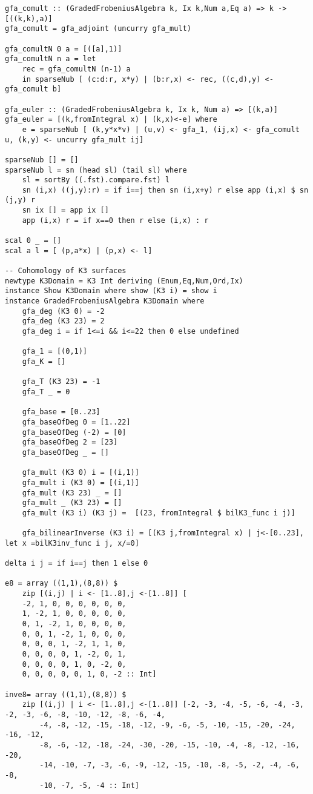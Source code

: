\begin{lstlisting}
gfa_comult :: (GradedFrobeniusAlgebra k, Ix k,Num a,Eq a) => k -> [((k,k),a)]
gfa_comult = gfa_adjoint (uncurry gfa_mult)

gfa_comultN 0 a = [([a],1)]
gfa_comultN n a = let
	rec = gfa_comultN (n-1) a
	in sparseNub [ (c:d:r, x*y) | (b:r,x) <- rec, ((c,d),y) <- gfa_comult b]

gfa_euler :: (GradedFrobeniusAlgebra k, Ix k, Num a) => [(k,a)]
gfa_euler = [(k,fromIntegral x) | (k,x)<-e] where 
	e = sparseNub [ (k,y*x*v) | (u,v) <- gfa_1, (ij,x) <- gfa_comult u, (k,y) <- uncurry gfa_mult ij] 

sparseNub [] = []
sparseNub l = sn (head sl) (tail sl) where
	sl = sortBy ((.fst).compare.fst) l
	sn (i,x) ((j,y):r) = if i==j then sn (i,x+y) r else app (i,x) $ sn (j,y) r
	sn ix [] = app ix []
	app (i,x) r = if x==0 then r else (i,x) : r

scal 0 _ = []
scal a l = [ (p,a*x) | (p,x) <- l]

-- Cohomology of K3 surfaces
newtype K3Domain = K3 Int deriving (Enum,Eq,Num,Ord,Ix)
instance Show K3Domain where show (K3 i) = show i
instance GradedFrobeniusAlgebra K3Domain where
	gfa_deg (K3 0) = -2
	gfa_deg (K3 23) = 2
	gfa_deg i = if 1<=i && i<=22 then 0 else undefined
	
	gfa_1 = [(0,1)]
	gfa_K = []
	
	gfa_T (K3 23) = -1
	gfa_T _ = 0
	
	gfa_base = [0..23]
	gfa_baseOfDeg 0 = [1..22]
	gfa_baseOfDeg (-2) = [0]
	gfa_baseOfDeg 2 = [23]
	gfa_baseOfDeg _ = []
	
	gfa_mult (K3 0) i = [(i,1)]
	gfa_mult i (K3 0) = [(i,1)]
	gfa_mult (K3 23) _ = []
	gfa_mult _ (K3 23) = []
	gfa_mult (K3 i) (K3 j) =  [(23, fromIntegral $ bilK3_func i j)]
	
	gfa_bilinearInverse (K3 i) = [(K3 j,fromIntegral x) | j<-[0..23], let x =bilK3inv_func i j, x/=0]

delta i j = if i==j then 1 else 0

e8 = array ((1,1),(8,8)) $
	zip [(i,j) | i <- [1..8],j <-[1..8]] [
	-2, 1, 0, 0, 0, 0, 0, 0,
	1, -2, 1, 0, 0, 0, 0, 0,
	0, 1, -2, 1, 0, 0, 0, 0,
	0, 0, 1, -2, 1, 0, 0, 0,
	0, 0, 0, 1, -2, 1, 1, 0,
	0, 0, 0, 0, 1, -2, 0, 1,
	0, 0, 0, 0, 1, 0, -2, 0,
	0, 0, 0, 0, 0, 1, 0, -2 :: Int]

inve8= array ((1,1),(8,8)) $
	zip [(i,j) | i <- [1..8],j <-[1..8]] [-2, -3, -4, -5, -6, -4, -3, -2, -3, -6, -8, -10, -12, -8, -6, -4,
		-4, -8, -12, -15, -18, -12, -9, -6, -5, -10, -15, -20, -24, -16, -12,
		-8, -6, -12, -18, -24, -30, -20, -15, -10, -4, -8, -12, -16, -20,
		-14, -10, -7, -3, -6, -9, -12, -15, -10, -8, -5, -2, -4, -6, -8,
		-10, -7, -5, -4 :: Int]


\end{lstlisting}
